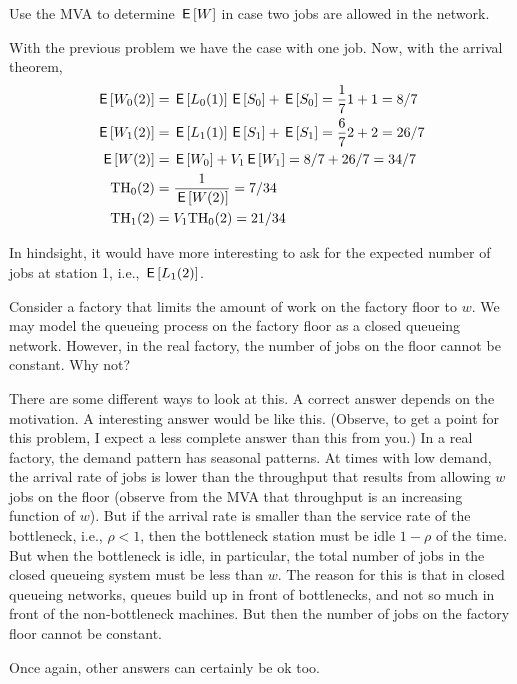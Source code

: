 \begin{exercise}[201804]
  Use the MVA to determine $\,\mathsf{E}\left[W\right]$ in case two jobs are allowed in the network.
\begin{solution}
    With the previous problem we have the case with one job. Now, with the arrival theorem,
    \begin{align*}
\,\mathsf{E}\left[W_{0}(2)\right] &= \,\mathsf{E}\left[L_0(1)\right]\,\mathsf{E}\left[S_0\right] +\,\mathsf{E}\left[S_0\right] = \frac{1}{7} 1 + 1=8/7\\
\,\mathsf{E}\left[W_{1}(2)\right] &= \,\mathsf{E}\left[L_1(1)\right]\,\mathsf{E}\left[S_1\right] +\,\mathsf{E}\left[S_1\right] = \frac{6}{7} 2 + 2 = 26/7\\
\,\mathsf{E}\left[W(2)\right] &= \,\mathsf{E}\left[W_0\right] + V_1 \,\mathsf{E}\left[W_1\right] = 8/7 + 26/7 = 34/7\\
\mathrm{TH}_0(2) &= \frac{1}{\,\mathsf{E}\left[W(2)\right]} = 7/34\\
\mathrm{TH}_1(2)&= V_1 \mathrm{TH}_0(2) = 21/34\\
    \end{align*}

In hindsight, it would have more interesting to ask for the expected number of jobs at station 1, i.e., $\,\mathsf{E}\left[L_1(2)\right]$. 
\end{solution}
\end{exercise}

\begin{exercise}[201804]
Consider a factory that limits the amount of work on the factory floor to $w$. We may model the queueing process on the factory floor as a closed queueing network.  However,  in the real factory, the number of jobs on the floor cannot be constant. Why not?
\begin{solution}
  There are some different ways to look at this. A correct answer depends on the motivation.  A interesting answer would be like this. (Observe, to get a point for this problem, I expect a less complete answer than this from you.) In a real factory, the demand pattern has  seasonal patterns. At times with low demand, the arrival rate of jobs is lower than the throughput that results from allowing $w$ jobs on the floor (observe from the MVA that throughput is an increasing function of $w$). But if the arrival rate is smaller than the service rate of the bottleneck, i.e., $\rho<1$, then the bottleneck station must be idle $1-\rho$ of the time. But when the bottleneck is idle, in particular, the total number of jobs in the closed queueing system must be less than $w$.  The reason for this is that in closed queueing networks, queues build up in front of bottlenecks, and not so much in front of the non-bottleneck machines.  But then the number of jobs on the factory floor cannot be constant. 

Once again, other answers can certainly be ok too. 
\end{solution}
\end{exercise}


